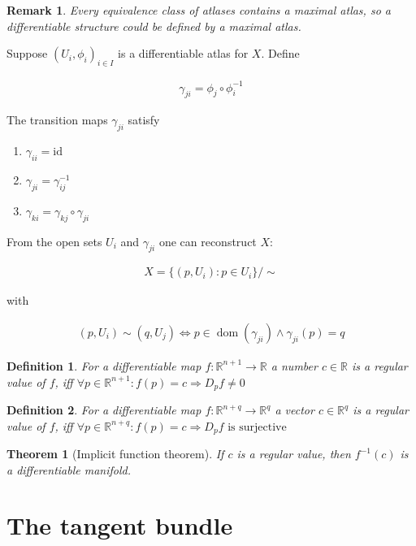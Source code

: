 \documentclass{scrartcl}
\newcommand{\R}{\mathbb R}
\newtheorem*{mydef}{Definition}
\newtheorem*{thm}{Theorem}
\newtheorem*{remark}{Remark}
\begin{document}
\begin{remark}
  Every equivalence class of atlases contains a maximal atlas, so a differentiable structure could be defined by a maximal atlas.
\end{remark}

Suppose ${(U_i,\phi_i)}_{i\in I}$ is a differentiable atlas for $X$. Define

\begin{align}
  \gamma_{ji} = \phi_j \circ \phi_i^{-1}
\end{align}

The transition maps $\gamma_{ji}$ satisfy

\begin{enumerate}
\item $\gamma_{ii}= \mathrm{id}$
\item $\gamma_{ji}=\gamma_{ij}^{-1}$
\item $\gamma_{ki}=\gamma_{kj}\circ \gamma_{ji}$
\end{enumerate}

From the open sets $U_i$ and $\gamma_{ji}$ one can reconstruct $X$:

\begin{align}
  X = \{ (p,U_i) : p \in U_i \}/{\sim}
\end{align}

with

\begin{align}
  (p,U_i) \sim (q,U_j) \Leftrightarrow p \in \operatorname{dom}(\gamma_{ji}) \land \gamma_{ji}(p)=q
\end{align}

\begin{mydef}
  For a differentiable map $f:\R^{n+1}\rightarrow\R$ a number $c\in\R$ is a \emph{regular value} of $f$, iff $\forall p\in \R^{n+1}: f(p)=c \Rightarrow D_p f \ne 0$
\end{mydef}

\begin{mydef}
  For a differentiable map $f:\R^{n+q}\rightarrow\R^q$ a vector $c\in\R^q$ is a \emph{regular value} of $f$, iff $\forall p\in \R^{n+q}: f(p)=c \Rightarrow D_p f \text{ is surjective}$
\end{mydef}

\begin{thm}[Implicit function theorem]
  If $c$ is a regular value, then $f^{-1}(c)$ is a differentiable manifold.
\end{thm}

\section{The tangent bundle}
\end{document}
